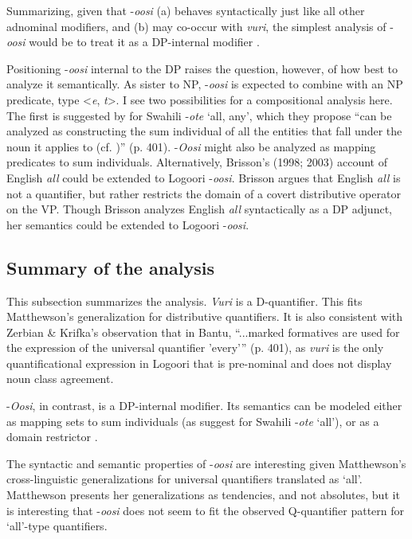 \documentclass[output=paper]{langsci/langscibook}
\begin{document}
  Summarizing, given that -\textit{oosi} (a) behaves syntactically just like all other adnominal modifiers, and (b) may co-occur with \textit{vuri}, the simplest analysis of -\textit{oosi} would be to treat it as a DP-internal modifier .

Positioning -\textit{oosi} internal to the DP raises the question, however, of how best to analyze it semantically. As sister to NP, -\textit{oosi} is expected to combine with an NP predicate, type <\textit{e},\textit{ t}>. I see two possibilities for a compositional analysis here. The first is suggested by \citet{ZerbianKrifka2008} for Swahili -\textit{ote} ‘all, any’, which they propose “can be analyzed as constructing the sum individual of all the entities that fall under the noun it applies to (cf. \citealt{Link1983})” (p. 401). -\textit{Oosi} might also be analyzed as mapping predicates to sum individuals. Alternatively, Brisson’s (1998; 2003) account of English \textit{all} could be extended to Logoori -\textit{oosi}. Brisson argues that English \textit{all} is not a quantifier, but rather restricts the domain of a covert distributive operator on the VP. Though Brisson analyzes English \textit{all} syntactically as a DP adjunct, her semantics could be extended to Logoori -\textit{oosi}. 

\subsection{Summary of the analysis}

This subsection summarizes the analysis. \textit{Vuri} is a D-quantifier. This fits Matthewson's generalization for distributive quantifiers. It is also consistent with Zerbian \& Krifka's observation that in Bantu, “...marked formatives are used for the expression of the universal quantifier 'every'” (p. 401), as \textit{vuri} is the only quantificational expression in Logoori that is pre-nominal and does not display noun class agreement. 

-\textit{Oosi}, in contrast, is a DP-internal modifier. Its semantics can be modeled either as mapping sets to sum individuals (as \citealt{ZerbianKrifka2008} suggest for Swahili -\textit{ote} ‘all’), or as a domain restrictor \citep{Brisson1998,Brisson2004}. 

The syntactic and semantic properties of -\textit{oosi} are interesting given Matthewson's cross-linguistic generalizations for universal quantifiers translated as ‘all’. Matthewson presents her generalizations as tendencies, and not absolutes, but it is interesting that -\textit{oosi} does not seem to fit the observed Q-quantifier pattern for ‘all’-type quantifiers. 
\end{document}
